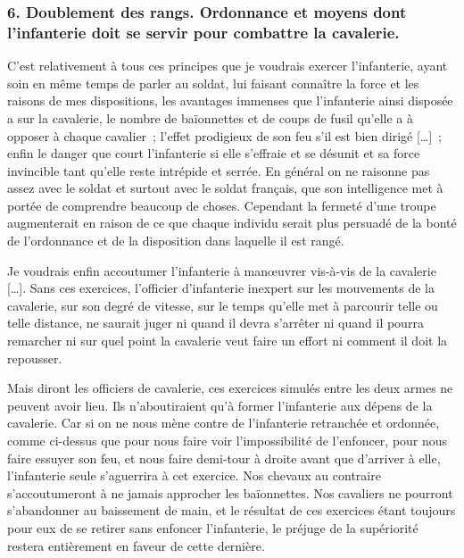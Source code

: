 \documentclass[french,twoside]{book} %
\begin{document}
\subsubsection[{6. Doublement des rangs. Ordonnance et moyens dont l’infanterie doit se servir pour combattre la cavalerie.}]{6. Doublement des rangs. Ordonnance et moyens dont l’infanterie doit se servir pour combattre la cavalerie.}
\noindent C’est relativement à tous ces principes que je voudrais exercer l’infanterie, ayant soin en même temps de parler au soldat, lui faisant connaître la force et les raisons de mes dispositions, les avantages immenses que l’infanterie ainsi disposée a sur la cavalerie, le nombre de baïonnettes et de coups de fusil qu’elle a à opposer à chaque cavalier ; l’effet prodigieux de son feu s’il est bien dirigé […] ; enfin le danger que court l’infanterie si elle s’effraie et se désunit et sa force invincible tant qu’elle reste intrépide et serrée. En général on ne raisonne pas assez avec le soldat et surtout avec le soldat français, que son intelligence met à portée de comprendre beaucoup de choses. Cependant la fermeté d’une troupe augmenterait en raison de ce que chaque individu serait plus persuadé de la bonté de l’ordonnance et de la disposition dans laquelle il est rangé.\par
Je voudrais enfin accoutumer l’infanterie à manœuvrer vis-à-vis de la cavalerie […]. Sans ces exercices, l’officier d’infanterie inexpert sur les mouvements de la cavalerie, sur son degré de vitesse, sur le temps qu’elle met à parcourir telle ou telle distance, ne saurait juger ni quand il devra s’arrêter ni quand il pourra remarcher ni sur quel point la cavalerie veut faire un effort ni comment il doit la repousser.\par
Mais diront les officiers de cavalerie, ces exercices simulés entre les deux armes ne peuvent avoir lieu. Ils n’aboutiraient qu’à former l’infanterie aux dépens de la cavalerie. Car si on ne nous mène contre de l’infanterie retranchée et ordonnée, comme ci-dessus que pour nous faire voir l’impossibilité de l’enfoncer, pour nous faire essuyer son feu, et nous faire demi-tour à droite avant que d’arriver à elle, l’infanterie seule s’aguerrira à cet exercice. Nos chevaux au contraire s’accoutumeront à ne jamais approcher les baïonnettes. Nos cavaliers ne pourront s’abandonner au baissement de main, et le résultat de ces exercices étant toujours pour eux de se retirer sans enfoncer l’infanterie, le préjuge de la supériorité restera entièrement en faveur de cette dernière.\par
\end{document}
